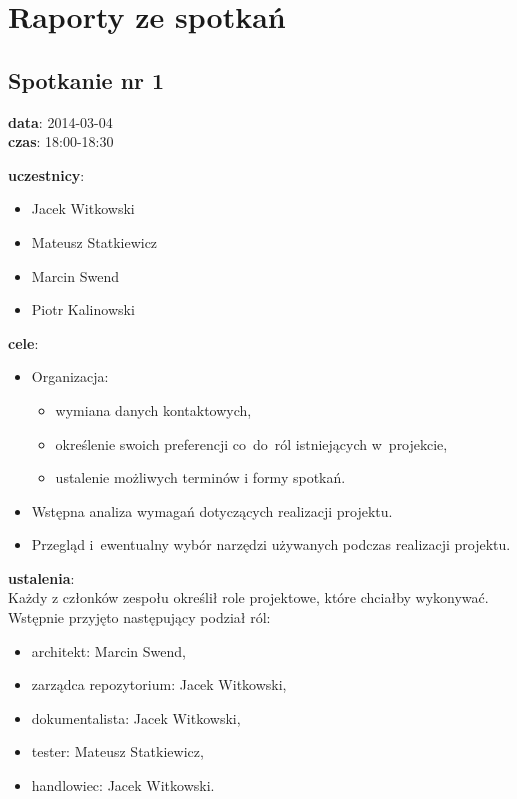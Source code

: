 \chapter[Raporty ze spotkań][Raporty ze spotkań]{Raporty ze spotkań}
\section[Spotkanie nr 1][Spotkanie nr 1]{Spotkanie nr 1}

\noindent
\textbf{data}: 2014-03-04 \\
\textbf{czas}: 18:00-18:30

\vspace{5mm}
\noindent
\textbf{uczestnicy}:
\begin{itemize}
	\item Jacek Witkowski
	\item Mateusz Statkiewicz
	\item Marcin Swend
	\item Piotr Kalinowski
\end{itemize}

\vspace{5mm}
\noindent
\textbf{cele}:
\begin{itemize}
  \item Organizacja:
  \begin{itemize}
    \item wymiana danych kontaktowych,
    \item określenie swoich preferencji co~do~ról istniejących w~projekcie,
    \item ustalenie możliwych terminów i formy spotkań.
  \end{itemize}
  \item Wstępna analiza wymagań dotyczących realizacji projektu.
  \item Przegląd i~ewentualny wybór narzędzi używanych podczas realizacji
  projektu.
\end{itemize}

\vspace{5mm}
\noindent
\textbf{ustalenia}: \\
Każdy z członków zespołu określił role projektowe, które chciałby wykonywać.
Wstępnie przyjęto następujący podział ról:
\begin{itemize}
  \item architekt: Marcin Swend,
  \item zarządca repozytorium: Jacek Witkowski,
  \item dokumentalista: Jacek Witkowski,
  \item tester: Mateusz Statkiewicz,
  \item handlowiec: Jacek Witkowski.
\end{itemize}


